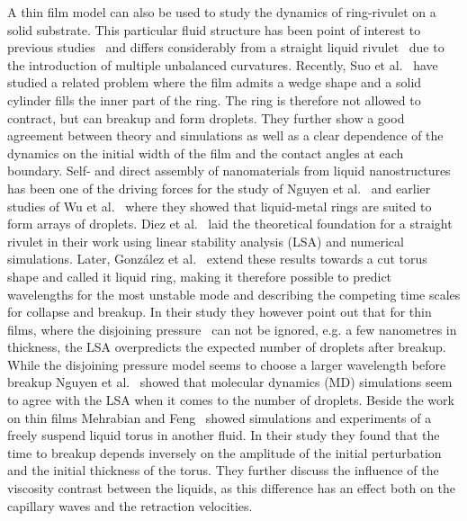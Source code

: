 \documentclass[twoside,twocolumn,9pt]{article}
\begin{document}
A thin film model can also be used to study the dynamics of ring-rivulet on a solid substrate.
This particular fluid structure has been point of interest to previous studies~\cite{nguyenCompetitionCollapseBreakup2012, gonzalezStabilityLiquidRing2013, wuCompetingLiquidPhase2011} and differs considerably from a straight liquid rivulet~\cite{diezBreakupFluidRivulets2009, diezStabilityFinitelengthRivulet2009, diezInstabilityTransverseLiquid2012} due to the introduction of multiple unbalanced curvatures.
Recently, Suo et al.~\cite{suoDewettingCornerFilm2023} have studied a related problem where the film admits a wedge shape and a solid cylinder fills the inner part of the ring. 
The ring is therefore not allowed to contract, but can breakup and form droplets.
They further show a good agreement between theory and simulations as well as a clear dependence of the dynamics on the initial width of the film and the contact angles at each boundary.
Self- and direct assembly of nanomaterials from liquid nanostructures has been one of the driving forces for the study of Nguyen et al.~\cite{nguyenCompetitionCollapseBreakup2012} and earlier studies of Wu et al.~\cite{wuBreakupPatternedNanoscale2010} where they showed that liquid-metal rings are suited to form arrays of droplets.
Diez et al.~\cite{diezBreakupFluidRivulets2009, diezStabilityFinitelengthRivulet2009} laid the theoretical foundation for a straight rivulet in their work using linear stability analysis (LSA) and numerical simulations. 
Later, Gonz{\'a}lez et al.~\cite{gonzalezStabilityLiquidRing2013} extend these results towards a cut torus shape and called it liquid ring, making it therefore possible to predict wavelengths for the most unstable mode and describing the competing time scales for collapse and breakup.
In their study they however point out that for thin films, where the disjoining pressure~\cite{schwartzSimulationDropletMotion1998, beckerComplexDewettingScenarios2003, oronLongscaleEvolutionThin1997} can not be ignored, e.g. a few nanometres in thickness, the LSA overpredicts  the expected number of droplets after breakup.
While the disjoining pressure model seems to choose a larger wavelength before breakup Nguyen et al.~\cite{nguyenCompetitionCollapseBreakup2012} showed that molecular dynamics (MD) simulations seem to agree with the LSA when it comes to the number of droplets.
Beside the work on thin films Mehrabian and Feng~\cite{mehrabianCapillaryBreakupLiquid2013} showed simulations and experiments of a freely suspend liquid torus in another fluid.
In their study they found that the time to breakup depends inversely on the amplitude of the initial perturbation and the initial thickness of the torus.
They further discuss the influence of the viscosity contrast between the liquids, as this difference has an effect both on the capillary waves and the retraction velocities.
\end{document}
